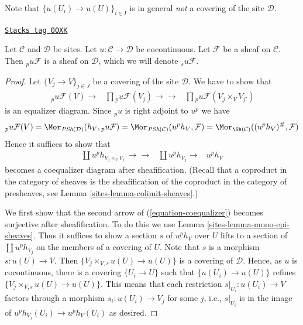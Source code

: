 Note that $\{u(U_i) \to u(U)\}_{i \in I}$ is in general {\it not}
a covering of the site $\mathcal{D}$.

\begin{lemma}[Pu sheaf]
\label{sites-lemma-pu-sheaf}
\href{https://stacks.math.columbia.edu/tag/00XK}{\texttt{Stacks tag 00XK}}

Let $\mathcal{C}$ and $\mathcal{D}$ be sites.
Let $u : \mathcal{C} \to \mathcal{D}$ be cocontinuous.
Let $\mathcal{F}$ be a sheaf on $\mathcal{C}$.
Then ${}_pu\mathcal{F}$ is a sheaf on $\mathcal{D}$,
which we will denote ${}_su\mathcal{F}$.
\end{lemma}

\begin{proof}

Let $\{V_j \to V\}_{j \in J}$ be a covering of the site $\mathcal{D}$.
We have to show that
$$
\begin{array}{ccccc} & \ \phantom{}_pu\mathcal{F}(V) \longrightarrow & \prod {}_pu\mathcal{F}(V_j) \longrightarrow\longrightarrow & \prod {}_pu\mathcal{F}(V_j \times_V V_{j'}) & \end{array}
$$
is an equalizer diagram. Since ${}_pu$ is right adjoint to $u^p$
we have
$$
{}_pu\mathcal{F}(V) =
\Mor_{\textit{PSh}(\mathcal{D})}(h_V, {}_pu\mathcal{F}) =
\Mor_{\textit{PSh}(\mathcal{C})}(u^ph_V, \mathcal{F}) =
\Mor_{\Sh(\mathcal{C})}((u^ph_V)^\#, \mathcal{F})
$$
Hence it suffices to show that
\begin{equation}
\label{equation-coequalizer}
\begin{array}{ccc}\coprod u^p h_{V_j \times_V V_{j'}} \longrightarrow\longrightarrow & \coprod u^p h_{V_j} \longrightarrow & u^p h_V\end{array}
\end{equation}
becomes a coequalizer diagram after sheafification. (Recall that a coproduct
in the category of sheaves is the sheafification of the coproduct in the
category of presheaves, see Lemma \ref{sites-lemma-colimit-sheaves}.)

\medskip\noindent
We first show that the second arrow of (\ref{equation-coequalizer})
becomes surjective after sheafification.
To do this we use Lemma \ref{sites-lemma-mono-epi-sheaves}. Thus it suffices to
show a section $s$ of $u^ph_V$ over $U$ lifts
to a section of $\coprod u^p h_{V_j}$ on the members of a covering of $U$.
Note that $s$ is a morphism $s : u(U) \to V$. Then
$\{V_j \times_{V, s} u(U) \to u(U)\}$ is a covering of $\mathcal{D}$.
Hence, as $u$ is cocontinuous, there is a covering $\{U_i \to U\}$
such that $\{u(U_i) \to u(U)\}$ refines $\{V_j \times_{V, s} u(U) \to u(U)\}$.
This means that each restriction $s|_{U_i} : u(U_i) \to V$ factors
through a morphism $s_i : u(U_i) \to V_j$ for some $j$, i.e., $s|_{U_i}$
is in the image of $u^ph_{V_j}(U_i) \to u^ph_V(U_i)$ as desired.


\end{proof}
